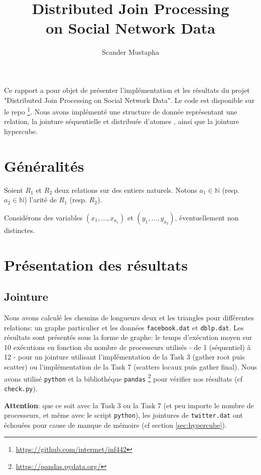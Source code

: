 \documentclass[12pt]{article}
\author{Scander Mustapha}
\title{Distributed Join Processing\\ on Social Network Data}
\affil{\'Ecole polytechnique}
\begin{document}
\maketitle
\let\olditem\item
\renewcommand{\item}{\olditem[$\bullet$]}

Ce rapport a pour objet de présenter l'implémentation et les résultats du projet "Distributed Join Processing on Social Network Data". Le code est disponible sur le repo \footnote{\url{https://github.com/intermet/inf442}}. Nous avons implémenté une structure de donnée représentant une relation, la jointure séquentielle et distribuée d'atomes , ainsi que la jointure hypercube.

\section{Généralités}
Soient $R_1$ et $R_2$ deux relations sur des entiers naturels.
Notons $a_1 \in \mathbb{N}$ (resp. $a_2 \in \mathbb{N}$) l'arité de $R_1$ (resp. $R_2$).

Considérons des variables $(x_1, \dots, x_{a_1})$ et $(y_1, \dots, y_{a_2})$, éventuellement non distinctes.

\section{Présentation des résultats}

\subsection{Jointure}
Nous avons calculé les chemins de longueurs deux et les triangles pour différentes relations: un graphe particulier et les données \verb?facebook.dat? et \verb?dblp.dat?.
Les résultats sont présentés sous la forme de graphe: le temps d'exécution moyen sur 10 exécutions en fonction du nombre de processeurs utilisés - de 1 (séquentiel) à 12 - pour un jointure utilisant l'implémentation de la Task 3 (gather root puis scatter) ou l'implémentation de la Task 7 (scatters locaux puis gather final).
Nous avons utilisé \verb?python? et la bibliothéque \verb?pandas? \footnote{\url{https://pandas.pydata.org/}} pour vérifier nos résultats (cf \verb?check.py?).


\large{\textbf{Attention}}: que ce soit avec la Task 3 ou la Task 7 (et peu importe le nombre de processeurs, et même avec le script \verb?python?), les jointures de \verb?twitter.dat? ont échouées pour cause de manque de mémoire (cf section \ref{sec:hypercube}). 
\end{document}

